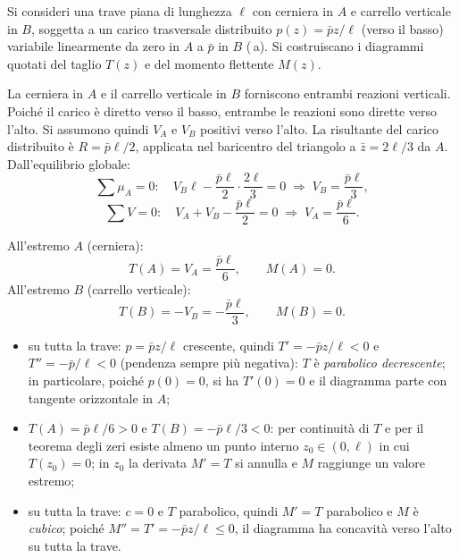 \begin{esempio}
	Si consideri una trave piana di lunghezza $\ell$
	con cerniera in $A$ e carrello verticale in $B$,
	soggetta a un carico trasversale distribuito
	$p(z) = \bar{p}z/\ell$ (verso il basso) variabile
	linearmente da zero in $A$ a $\bar{p}$ in $B$ (\,a).
	Si costruiscano i diagrammi quotati del taglio $T(z)$
	e del momento flettente $M(z)$.
	
	\begin{svolgimento}
		



		
		
		
		La cerniera in $A$ e il carrello verticale in $B$
		forniscono entrambi reazioni verticali.
		Poiché il carico è diretto verso il basso,
		entrambe le reazioni sono dirette verso l'alto.
		Si assumono quindi $V_A$ e $V_B$ positivi
		verso l'alto.
		La risultante del carico distribuito è
		$R = \bar{p}\ell/2$, applicata nel baricentro
		del triangolo a $\bar{z} = 2\ell/3$ da $A$.
		Dall'equilibrio globale:
		\[
		\sum \mu_A = 0:\quad
		V_B\ell - \frac{\bar{p}\ell}{2}\cdot\frac{2\ell}{3} = 0
		\;\Rightarrow\;
		V_B = \frac{\bar{p}\ell}{3},
		\]
		\[
		\sum V = 0:\quad
		V_A + V_B - \frac{\bar{p}\ell}{2} = 0
		\;\Rightarrow\;
		V_A = \frac{\bar{p}\ell}{6}.
		\]
		
		All'estremo $A$ (cerniera):
		\[
		T(A) = V_A = \frac{\bar{p}\ell}{6}, \qquad M(A) = 0.
		\]
		All'estremo $B$ (carrello verticale):
		\[
		T(B) = -V_B = -\frac{\bar{p}\ell}{3}, \qquad M(B) = 0.
		\]
		
		\begin{itemize}[nosep]
			\item su tutta la trave: $p = \bar{p}z/\ell$
			crescente, quindi $T' = -\bar{p}z/\ell < 0$
			e $T'' = -\bar{p}/\ell < 0$ (pendenza
			sempre più negativa): $T$ è
			\emph{parabolico decrescente}; in
			particolare, poiché $p(0) = 0$, si ha
			$T'(0) = 0$ e il diagramma parte con
			tangente orizzontale in $A$;
			\item $T(A) = \bar{p}\ell/6 > 0$ e
			$T(B) = -\bar{p}\ell/3 < 0$: per
			continuità di $T$ e per il teorema
			degli zeri esiste almeno un punto
			interno $z_0 \in (0,\ell)$ in cui
			$T(z_0) = 0$; in $z_0$ la derivata
			$M' = T$ si annulla e $M$ raggiunge
			un valore estremo;
			\item su tutta la trave: $c = 0$ e $T$
			parabolico, quindi $M' = T$ parabolico
			e $M$ è \emph{cubico}; poiché
			$M'' = T' = -\bar{p}z/\ell \leq 0$,
			il diagramma ha concavità verso l'alto
			su tutta la trave.
		\end{itemize}
		

\end{svolgimento}
\end{esempio}
